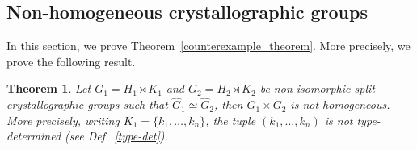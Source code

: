 \documentclass[a4paper, 11pt]{amsart}
\newtheorem{te}{Theorem}[section]
\theoremstyle{definition}
\theoremstyle{remark}
\begin{document}

\subsection{Non-homogeneous crystallographic groups}\label{counter}

In this section, we prove Theorem~\ref{counterexample_theorem}. More precisely, we prove the following result.

\begin{te}\label{counterexample_theorem2}Let $G_1=H_1\rtimes K_1$ and $G_2=H_2\rtimes K_2$ be non-isomorphic split crystallographic groups such that $\widehat{G}_1\simeq \widehat{G}_2$, then $G_1 \times G_2$ is not homogeneous. More precisely, writing $K_1=\lbrace k_1,\ldots,k_n\rbrace$, the tuple $(k_1,\ldots,k_n)$ is not type-determined (see Def.~\ref{type-det}).\end{te}
\end{document}
